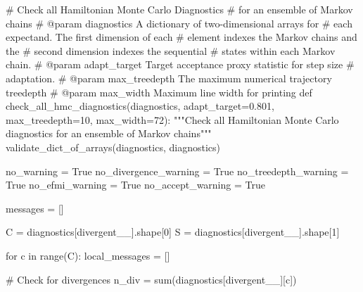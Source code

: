 \documentclass[
  letterpaper,
  DIV=11,
  numbers=noendperiod]{scrartcl}
\newenvironment{Shaded}{\begin{snugshade}}{\end{snugshade}}
\newcommand{\BuiltInTok}[1]{\textcolor[rgb]{0.00,0.23,0.31}{#1}}
\newcommand{\CommentTok}[1]{\textcolor[rgb]{0.37,0.37,0.37}{#1}}
\newcommand{\ControlFlowTok}[1]{\textcolor[rgb]{0.00,0.23,0.31}{#1}}
\newcommand{\DecValTok}[1]{\textcolor[rgb]{0.68,0.00,0.00}{#1}}
\newcommand{\FloatTok}[1]{\textcolor[rgb]{0.68,0.00,0.00}{#1}}
\newcommand{\KeywordTok}[1]{\textcolor[rgb]{0.00,0.23,0.31}{#1}}
\newcommand{\NormalTok}[1]{\textcolor[rgb]{0.00,0.23,0.31}{#1}}
\newcommand{\OperatorTok}[1]{\textcolor[rgb]{0.37,0.37,0.37}{#1}}
\newcommand{\StringTok}[1]{\textcolor[rgb]{0.13,0.47,0.30}{#1}}
\newcommand{\VariableTok}[1]{\textcolor[rgb]{0.07,0.07,0.07}{#1}}
\begin{document}
\begin{Shaded}
\begin{Highlighting}[]
\CommentTok{\# Check all Hamiltonian Monte Carlo Diagnostics}
\CommentTok{\# for an ensemble of Markov chains}
\CommentTok{\# @param diagnostics A dictionary of two{-}dimensional arrays for}
\CommentTok{\#                    each expectand.  The first dimension of each}
\CommentTok{\#                    element indexes the Markov chains and the}
\CommentTok{\#                    second dimension indexes the sequential}
\CommentTok{\#                    states within each Markov chain.}
\CommentTok{\# @param adapt\_target Target acceptance proxy statistic for step size}
\CommentTok{\#                     adaptation.}
\CommentTok{\# @param max\_treedepth The maximum numerical trajectory treedepth}
\CommentTok{\# @param max\_width Maximum line width for printing}
\KeywordTok{def}\NormalTok{ check\_all\_hmc\_diagnostics(diagnostics,}
\NormalTok{                              adapt\_target}\OperatorTok{=}\FloatTok{0.801}\NormalTok{,}
\NormalTok{                              max\_treedepth}\OperatorTok{=}\DecValTok{10}\NormalTok{,}
\NormalTok{                              max\_width}\OperatorTok{=}\DecValTok{72}\NormalTok{):}
  \CommentTok{"""Check all Hamiltonian Monte Carlo diagnostics for an}
\CommentTok{     ensemble of Markov chains"""}
\NormalTok{  validate\_dict\_of\_arrays(diagnostics, }\StringTok{\textquotesingle{}diagnostics\textquotesingle{}}\NormalTok{)}

\NormalTok{  no\_warning }\OperatorTok{=} \VariableTok{True}
\NormalTok{  no\_divergence\_warning }\OperatorTok{=} \VariableTok{True}
\NormalTok{  no\_treedepth\_warning }\OperatorTok{=} \VariableTok{True}
\NormalTok{  no\_efmi\_warning }\OperatorTok{=} \VariableTok{True}
\NormalTok{  no\_accept\_warning }\OperatorTok{=} \VariableTok{True}
  
\NormalTok{  messages }\OperatorTok{=}\NormalTok{ []}
  
\NormalTok{  C }\OperatorTok{=}\NormalTok{ diagnostics[}\StringTok{\textquotesingle{}divergent\_\_\textquotesingle{}}\NormalTok{].shape[}\DecValTok{0}\NormalTok{]}
\NormalTok{  S }\OperatorTok{=}\NormalTok{ diagnostics[}\StringTok{\textquotesingle{}divergent\_\_\textquotesingle{}}\NormalTok{].shape[}\DecValTok{1}\NormalTok{]}
  
  \ControlFlowTok{for}\NormalTok{ c }\KeywordTok{in} \BuiltInTok{range}\NormalTok{(C):}
\NormalTok{    local\_messages }\OperatorTok{=}\NormalTok{ []}
    
    \CommentTok{\# Check for divergences}
\NormalTok{    n\_div }\OperatorTok{=} \BuiltInTok{sum}\NormalTok{(diagnostics[}\StringTok{\textquotesingle{}divergent\_\_\textquotesingle{}}\NormalTok{][c])}
    

\end{Highlighting}
\end{Shaded}
\end{document}
